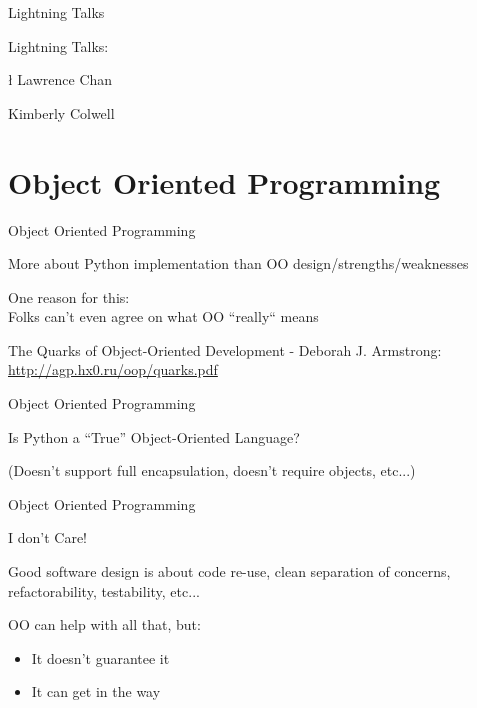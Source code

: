 \documentclass{beamer}
\begin{document}
\begin{frame}{Lightning Talks}

{\LARGE Lightning Talks:}

{\l\Large
\vfill
Lawrence Chan

\vfill
Kimberly Colwell

}
\end{frame}

\section{Object Oriented Programming}

\begin{frame}[fragile]{Object Oriented Programming}

\vfill
 {\Large More about Python implementation than OO design/strengths/weaknesses}

\vfill
{\Large One reason for this:\\
Folks can't even agree on what OO ``really`` means}

\vfill
The Quarks of Object-Oriented Development - Deborah J. Armstrong:\\
\url{http://agp.hx0.ru/oop/quarks.pdf}

\end{frame} 

\begin{frame}[fragile]{Object Oriented Programming}

\vfill
 {\LARGE Is Python a ``True'' Object-Oriented Language?}

\vfill
{\Large (Doesn't support full encapsulation, doesn't require
objects, etc...)}

\end{frame} 

\begin{frame}[fragile]{Object Oriented Programming}

\vfill
 {\LARGE I don't Care!}

\vfill
{\Large Good software design is about code re-use, clean separation of concerns,
refactorability, testability, etc...}

\vfill
{\Large OO can help with all that, but:
\begin{itemize}
  \item It doesn't guarantee it
  \item It can get in the way
\end{itemize}
}

\end{frame} 
\end{document}
